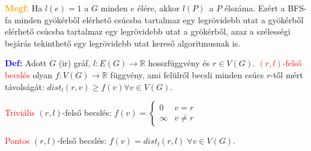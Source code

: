 \documentclass[../../szobeli.tex]{subfiles}
\begin{document}
\begin{itemize}
        \textbf{\textcolor{orange}{Megf:}} Ha $l(e) = 1 $ a $G$ minden $e$ élére, akkor $l(P)$ a $P$ élszáma. Ezért a BFS-fa minden gyökérből elérhető csúcsba tartalmaz egy legrövidebb utat a gyökérből elérhető csúcsba tartalmaz egy legrövidebb utat a gyökérből, azaz a szélességi bejárás tekinthető egy legrövidebb utat kereső algoritmusnak is. 

        \textbf{\textcolor{blue}{Def:}} Adott $G$ (ir) gráf, $l : E(G) \rightarrow \mathbb{R}$ hosszfüggvény és $r \in V(G)$. \textcolor{red}{$(r,l)$-felső becslés} olyan $f: V(G) \rightarrow \mathbb{R}$ függvény, ami felülről becsli minden csúcs $r$-től mért távolságát: $dist_l (r,v) \geq f(v) \forall v \in V(G)$.

        \textcolor{red}{Triviális} $(r,l)$-felső becslés:
        $
            f(v) = \begin{cases}
                0 & v = r \\
                \infty & v \neq r
            \end{cases}
        $

        \textcolor{red}{Pontos} $(r,l)$-felső becslés: $f(v) = dist_l(r,l)\; \forall v \in V(G)$.
    \end{itemize}
\end{document}
